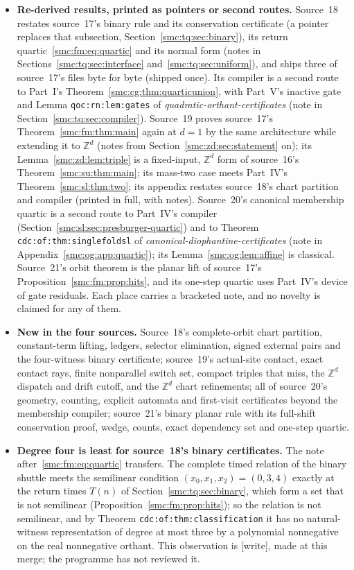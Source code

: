 \documentclass[11pt,letterpaper]{article}
\numberwithin{equation}{section}
\theoremstyle{definition}
\theoremstyle{remark}
\newcommand{\Z}{\mathbb Z}
\newcommand{\wtag}{\textup{[write]}}
\begin{document}
\begin{itemize}
\item \textbf{Re-derived results, printed as pointers or second routes.} Source~18 restates source~17's binary rule and its conservation certificate (a pointer replaces that subsection, Section~\ref{smc:tq:sec:binary}), its return quartic~\eqref{smc:fm:eq:quartic} and its normal form (notes in Sections~\ref{smc:tq:sec:interface} and~\ref{smc:tq:sec:uniform}), and ships three of source~17's files byte for byte (shipped once). Its compiler is a second route to Part~I's Theorem~\ref{smc:cg:thm:quarticunion}, with Part~V's inactive gate and Lemma \texttt{qoc:rn:lem:gates} of \emph{quadratic-orthant-certificates} (note in Section~\ref{smc:tq:sec:compiler}). Source~19 proves source~17's Theorem~\ref{smc:fm:thm:main} again at $d=1$ by the same architecture while extending it to $\Z^d$ (notes from Section~\ref{smc:zd:sec:statement} on); its Lemma~\ref{smc:zd:lem:triple} is a fixed-input, $\Z^d$ form of source~16's Theorem~\ref{smc:su:thm:main}; its mass-two case meets Part~IV's Theorem~\ref{smc:sl:thm:two}; its appendix restates source~18's chart partition and compiler (printed in full, with notes). Source~20's canonical membership quartic is a second route to Part~IV's compiler (Section~\ref{smc:sl:sec:presburger-quartic}) and to Theorem \texttt{cdc:of:thm:singlefoldsl} of \emph{canonical-diophantine-certificates} (note in Appendix~\ref{smc:og:app:quartic}); its Lemma~\ref{smc:og:lem:affine} is classical. Source~21's orbit theorem is the planar lift of source~17's Proposition~\ref{smc:fm:prop:hits}, and its one-step quartic uses Part~IV's device of gate residuals. Each place carries a bracketed note, and no novelty is claimed for any of them.
\item \textbf{New in the four sources.} Source~18's complete-orbit chart partition, constant-term lifting, ledgers, selector elimination, signed external pairs and the four-witness binary certificate; source~19's actual-site contact, exact contact rays, finite nonparallel switch set, compact triples that miss, the $\Z^d$ dispatch and drift cutoff, and the $\Z^d$ chart refinements; all of source~20's geometry, counting, explicit automata and first-visit certificates beyond the membership compiler; source~21's binary planar rule with its full-shift conservation proof, wedge, counts, exact dependency set and one-step quartic.
\item \textbf{Degree four is least for source~18's binary certificates.} The note after~\eqref{smc:fm:eq:quartic} transfers. The complete timed relation of the binary shuttle meets the semilinear condition $(x_0,x_1,x_2)=(0,3,4)$ exactly at the return times $T(n)$ of Section~\ref{smc:tq:sec:binary}, which form a set that is not semilinear (Proposition~\ref{smc:fm:prop:hits}); so the relation is not semilinear, and by Theorem \texttt{cdc:of:thm:classification} it has no natural-witness representation of degree at most three by a polynomial nonnegative on the real nonnegative orthant. This observation is \wtag, made at this merge; the programme has not reviewed it.

\end{itemize}
\end{document}
